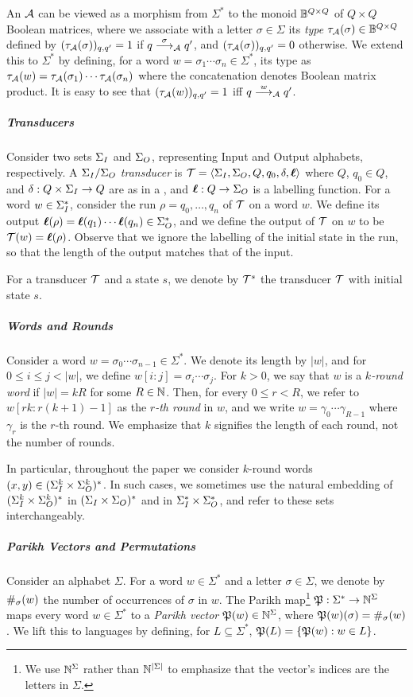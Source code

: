 An \NFA $\mathcal{A}$ can be viewed as a morphism from $\Sigma^*$ to the monoid $\mathbb{B}^{Q\times Q}$ of $Q\times Q$ Boolean matrices, where we associate with a letter $\sigma\in \Sigma$ its \emph{type} $\tau_{\mathcal{A}}(\sigma)\in \mathbb{B}^{Q\times Q}$ defined by $(\tau_{\mathcal{A}}(\sigma))_{q,q'}=1$ if $q\stackrel{\sigma}{\longrightarrow}_{\mathcal{A}}q'$, and $(\tau_{\mathcal{A}}(\sigma))_{q,q'}=0$ otherwise. We extend this to $\Sigma^*$ by defining, for a word $w=\sigma_1\cdots \sigma_n\in \Sigma^*$, its type as $\tau_{\mathcal{A}}(w)=\tau_{\mathcal{A}}(\sigma_1)\cdots \tau_{\mathcal{A}}(\sigma_n)$ where the concatenation denotes Boolean matrix product. It is easy to see that $(\tau_{\mathcal{A}}(w))_{q,q'}=1$ iff $q\stackrel{w}{\longrightarrow}_{\mathcal{A}}q'$.

\subparagraph*{Transducers} Consider two sets $\Sigma_{I}$ and $\Sigma_{O}$, representing Input and Output alphabets, respectively. A \emph{$\Sigma_{I}/\Sigma_{O}$ transducer} is $\mathcal{T}=\left< \Sigma_{I},\Sigma_{O},Q,q_0,\delta,\boldsymbol{\ell}\right>$ where $Q$, $q_0\in Q$, and $\delta:Q\times \Sigma_{I}\to Q$ are as in a \DFA, and $\boldsymbol{\ell}:Q\to \Sigma_{O}$ is a labelling function. For a word $w\in \Sigma_{I}^*$, consider the run $\rho=q_0,\ldots,q_n$ of $\mathcal{T}$ on a word $w$. We define its output $\boldsymbol{\ell}(\rho)=\boldsymbol{\ell}(q_1)\cdots\boldsymbol{\ell}(q_n)\in \Sigma_{O}^*$, and we define the output of $\mathcal{T}$ on $w$ to be $\mathcal{T}(w)=\boldsymbol{\ell}(\rho)$. Observe that we ignore the labelling of the initial state in the run, so that the length of the output matches that of the input.

For a transducer $\mathcal{T}$ and a state $s$, we denote by $\mathcal{T}^s$ the transducer $\mathcal{T}$ with  initial \nolinebreak state \nolinebreak $s$.

\subparagraph*{Words and Rounds}
Consider a word $w=\sigma_0\cdots \sigma_{n-1}\in \Sigma^*$. We denote its length by $|w|$, and for $0\le i\le j< |w|$, we define $w[i:j]=\sigma_i\cdots \sigma_j$. 
For $k>0$, we say that $w$ is a \emph{$k$-round word} if $|w|=kR$ for some $R\in \mathbb{N}$. Then, for every $0\le r<R$, we refer to $w[rk:r(k+1)-1]$ as the \emph{$r$-th round} in $w$, and we write $w=\gamma_0\cdots \gamma_{R-1}$ where $\gamma_r$ is the $r$-th round. We emphasize that $k$ signifies the length of each round, not the number of rounds.

In particular, throughout the paper we consider $k$-round words $(x,y)\in (\Sigma_{I}^k\times \Sigma_{O}^k)^*$. In such cases, we sometimes use the natural embedding of $(\Sigma_{I}^k\times \Sigma_{O}^k)^*$ in $(\Sigma_{I}\times \Sigma_{O})^*$ and in $\Sigma_{I}^*\times \Sigma_{O}^*$, and refer to these sets interchangeably.

\subparagraph*{Parikh Vectors and Permutations}
Consider an alphabet $\Sigma$. For a word $w\in \Sigma^*$ and a letter $\sigma\in \Sigma$, we denote by $\#_\sigma(w)$ the number of occurrences of $\sigma$ in $w$. 
The Parikh map\footnote{We use $\mathbb{N}^\Sigma$ rather than $\mathbb{N}^{|\Sigma|}$ to emphasize that the vector's indices are the letters in $\Sigma$.} $\mathfrak{P}:\Sigma^*\to \mathbb{N}^\Sigma$ maps every word $w\in \Sigma^*$ to a \emph{Parikh vector} $\mathfrak{P}(w)\in \mathbb{N}^\Sigma$, where $\mathfrak{P}(w)(\sigma)=\#_\sigma(w)$. We lift this to languages by defining, for $L\subseteq \Sigma^*$, $\mathfrak{P}(L)=\{\mathfrak{P}(w):w\in L\}$. 

